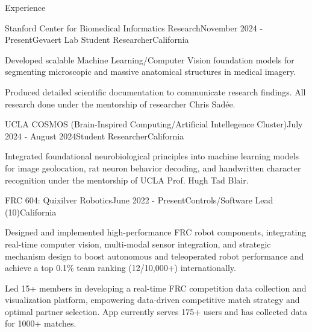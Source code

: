 \documentclass[
  10pt, %
]{resume}
\begin{document}
\sloppy


\begin{rSection}{Experience}


  \begin{rSubsection}{Stanford Center for Biomedical Informatics Research}{November 2024 - Present}{Gevaert Lab Student Researcher}{California}
    
    \item Developed scalable Machine Learning/Computer Vision foundation models for segmenting microscopic and massive anatomical structures in medical imagery.
    
    \item Produced detailed scientific documentation to communicate research findings. All research done under the mentorship of researcher Chris Sadée.
    
  \end{rSubsection}
        
  \begin{rSubsection}{UCLA COSMOS (Brain-Inspired Computing/Artificial Intellegence Cluster)}{July 2024 - August 2024}{Student Researcher}{California}
    
    \item Integrated foundational neurobiological principles into machine learning models for image geolocation, rat neuron behavior decoding, and handwritten character recognition under the mentorship of UCLA Prof. Hugh Tad Blair.
    
  \end{rSubsection}
        
  \begin{rSubsection}{FRC 604: Quixilver Robotics}{June 2022 - Present}{Controls/Software Lead (10)}{California}
    
    \item Designed and implemented high-performance FRC robot components, integrating real-time computer vision, multi-modal sensor integration, and strategic mechanism design to boost autonomous and teleoperated robot performance and achieve a top 0.1\% team ranking (12/10,000+) internationally.
    
    \item Led 15+ members in developing a real-time FRC competition data collection and visualization platform, empowering data-driven competitive match strategy and optimal partner selection. App currently serves 175+ users and has collected data for 1000+ matches.
    
  \end{rSubsection}
        
	
\end{rSection}
\end{document}
